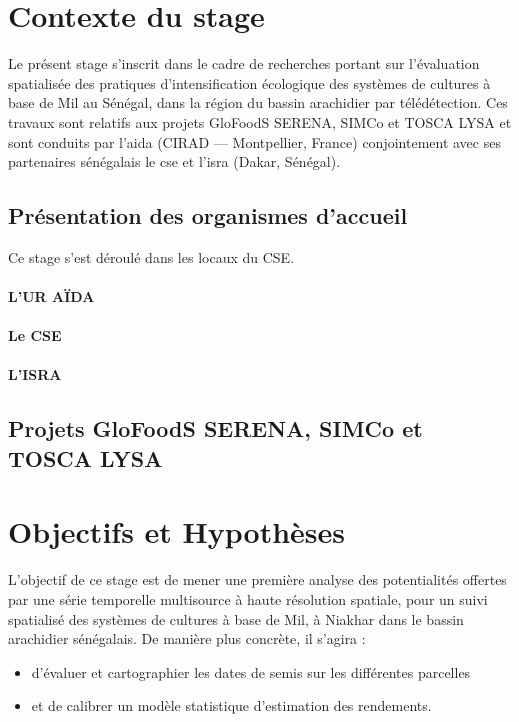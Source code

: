 \section{Contexte du stage}

Le présent stage s'inscrit dans le cadre de recherches portant sur l’évaluation spatialisée des pratiques d’intensification écologique des systèmes de cultures à base de Mil au 
Sénégal, dans la région du bassin arachidier par télédétection. Ces travaux sont relatifs aux projets GloFoodS SERENA, SIMCo et TOSCA LYSA et sont conduits par 
l'\acrshort{aida} (CIRAD --- Montpellier, France) conjointement avec ses partenaires sénégalais le \acrshort{cse} et l'\acrshort{isra} (Dakar, Sénégal).

  \subsection{Présentation des organismes d'accueil}
Ce stage s'est déroulé dans les locaux du CSE.
    
    \paragraph{L'UR AÏDA}
    
    \paragraph{Le CSE}
    
    \paragraph{L'ISRA}
    
  
  \subsection{Projets GloFoodS SERENA, SIMCo et TOSCA LYSA}

\section{Objectifs et Hypothèses}

L'objectif de ce stage est de mener une première analyse des potentialités offertes par une série temporelle multisource à haute résolution spatiale, pour un suivi spatialisé des 
systèmes de cultures à base de Mil, à Niakhar dans le bassin arachidier sénégalais. De manière plus concrète, il s'agira :
  \begin{itemize}
   \item d'évaluer et cartographier les dates de semis sur les différentes parcelles
   \item et de calibrer un modèle statistique d'estimation des rendements.
  \end{itemize}
 
